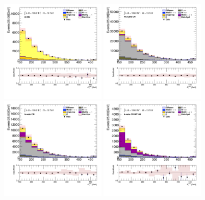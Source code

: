 		\begin{figure}[!thp]
			\begin{center}    
			\includegraphics[width=0.45\textwidth]{chapters/chapter6_HPlus/images/taujets/met_et_TTBAR.png}
			\includegraphics[width=0.45\textwidth]{chapters/chapter6_HPlus/images/taujets/met_et_WJETS.png} \\
			\includegraphics[width=0.45\textwidth]{chapters/chapter6_HPlus/images/taujets/met_et_BVETO.png}
			\includegraphics[width=0.45\textwidth]{chapters/chapter6_HPlus/images/taujets/met_et_BVETO_MT100.png} \\

\end{center}
\end{figure}
